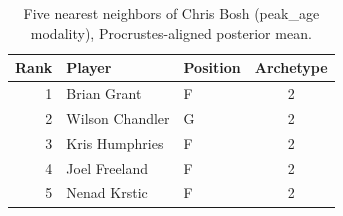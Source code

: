 \begin{table}[htbp]
  \centering\small
  \begin{tabular}{rllc}
    \toprule
    Rank & Player & Position & Archetype \\
    \midrule
    1 & Brian Grant & F & 2 \\
    2 & Wilson Chandler & G & 2 \\
    3 & Kris Humphries & F & 2 \\
    4 & Joel Freeland & F & 2 \\
    5 & Nenad Krstic & F & 2 \\
    \bottomrule
  \end{tabular}
  \caption{Five nearest neighbors of Chris Bosh (peak_age modality), Procrustes-aligned posterior mean.}
  \label{tab:Chris_Bosh_neighbors_peak_age}
\end{table}

